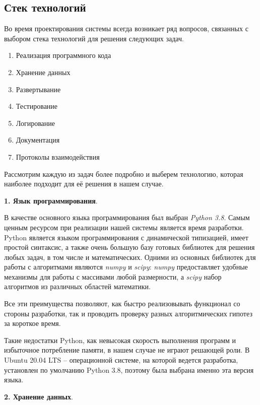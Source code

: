 \subsection{\Large{Стек технологий}}

Во время проектирования системы всегда возникает ряд вопросов,
связанных с выбором стека технологий для решения следующих задач.

\begin{enumerate}
    \item Реализация программного кода
    \item Хранение данных
    \item Развертывание
    \item Тестирование
    \item Логирование
    \item Документация
    \item Протоколы взаимодействия
\end{enumerate}

Рассмотрим каждую из задач более подробно и выберем технологию, которая наиболее подходит для её решения в нашем случае.

\noindent \textbf{1. Язык программирования}.

В качестве основного языка программирования был выбран \textit{Python 3.8}\cite{PythonReference}.
Самым ценным ресурсом при реализации нашей системы является время разработки. Python является языком программирования
с динамической типизацией, имеет простой синтаксис,
а также очень большую базу готовых библиотек для решения любых задач,
в том числе и математических. Одними из основных библиотек для работы с алгоритмами являются
\textit{numpy} и \textit{scipy}: \textit{numpy} предоставляет удобные механизмы для работы
с массивами любой размерности, а \textit{scipy} набор алгоритмов из различных областей математики.

Все эти преимущества позволяют, как быстро реализовывать функционал со стороны разработки, так и проводить проверку
разных алгоритмических гипотез за короткое время.

Такие недостатки Python, как невысокая скорость выполнения программ и избыточное потребление памяти, в нашем случае
не играют решающей роли\cite{PythonProsAndCons}.
В Ubuntu 20.04 LTS -- операционной системе, на которой ведется разработка, установлен по умолчанию Python 3.8, поэтому
была выбрана именно эта версия языка.

\noindent \textbf{2. Хранение данных}.


